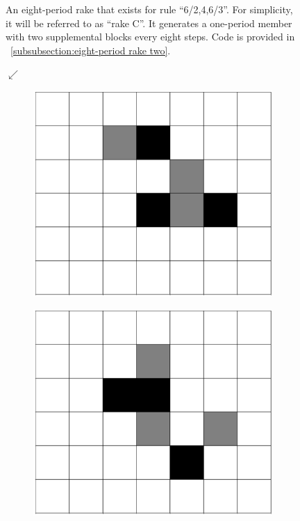 \documentclass[12pt]{article}
\numberwithin{figure}{section} %
\begin{document}
\begin{figure}[H]
\begin{subfigure}{0.3\textwidth}
     \subcaption{}
   \end{subfigure}
   \setcounter{subfigure}{0}
   \caption[Another eight-period rake]{An eight-period rake that exists for rule “6/2,4,6/3”. For simplicity, it will be referred to as “rake C”. It generates a one-period member with two supplemental blocks every eight steps. Code is provided in ~\ref{subsubsection:eight-period rake two}.}
   \label{fig:eight-period rake two}
   \vspace{-1.5em}
\end{figure}

\begin{figure}[H]
      {\LARGE$\swarrow{}$}
	\begin{subfigure}{0.18\textwidth}
     	\centering
     	\includegraphics[width=\linewidth]{Section4/30.0}
     	\subcaption{}
   	\end{subfigure}
    	\begin{subfigure}{0.18\textwidth}
     	\centering
     	\includegraphics[width=\linewidth]{Section4/30.1}

\end{subfigure}
\end{figure}
\end{document}
